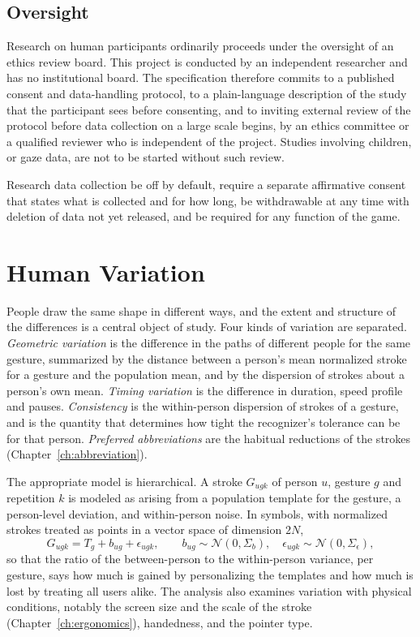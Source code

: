 \section{Oversight}

Research on human participants ordinarily proceeds under the oversight of an ethics review board. This project is conducted by an independent researcher and has no institutional board. The specification therefore commits to a published consent and data-handling protocol, to a plain-language description of the study that the participant sees before consenting, and to inviting external review of the protocol before data collection on a large scale begins, by an ethics committee or a qualified reviewer who is independent of the project. Studies involving children, or gaze data, are not to be started without such review.\evS

\begin{requirement}\label{req:consent}
Research data collection \must{} be off by default, \must{} require a separate affirmative consent that states what is collected and for how long, \must{} be withdrawable at any time with deletion of data not yet released, and \mustnot{} be required for any function of the game.\evS
\end{requirement}

\chapter{Human Variation}\label{ch:human-variation}

People draw the same shape in different ways, and the extent and structure of the differences is a central object of study. Four kinds of variation are separated. \emph{Geometric variation} is the difference in the paths of different people for the same gesture, summarized by the distance between a person's mean normalized stroke for a gesture and the population mean, and by the dispersion of strokes about a person's own mean. \emph{Timing variation} is the difference in duration, speed profile and pauses. \emph{Consistency} is the within-person dispersion of strokes of a gesture, and is the quantity that determines how tight the recognizer's tolerance can be for that person. \emph{Preferred abbreviations} are the habitual reductions of the strokes (Chapter~\ref{ch:abbreviation}).

The appropriate model is hierarchical. A stroke $G_{ugk}$ of person $u$, gesture $g$ and repetition $k$ is modeled as arising from a population template for the gesture, a person-level deviation, and within-person noise. In symbols, with normalized strokes treated as points in a vector space of dimension $2N$,
\[
G_{ugk}=T_g+b_{ug}+\epsilon_{ugk},\qquad b_{ug}\sim\mathcal N(0,\Sigma_{b}),\quad \epsilon_{ugk}\sim\mathcal N(0,\Sigma_{\epsilon}),
\]
so that the ratio of the between-person to the within-person variance, per gesture, says how much is gained by personalizing the templates and how much is lost by treating all users alike. The analysis also examines variation with physical conditions, notably the screen size and the scale of the stroke (Chapter~\ref{ch:ergonomics}), handedness, and the pointer type.

